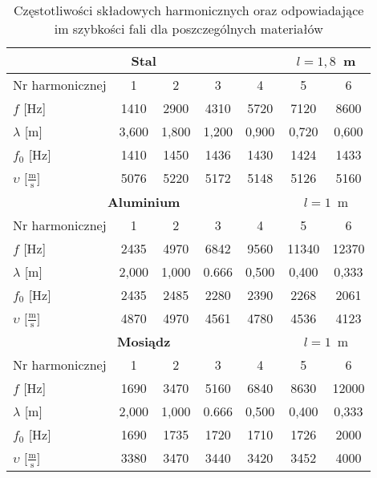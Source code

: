 \documentclass[12pt,a4paper]{article}
\numberwithin{equation}{section}
\begin{document}
\pagebreak
\begin{table}[!ht]
	\caption{Częstotliwości składowych harmonicznych oraz odpowiadające im szybkości fali dla poszczególnych materiałów}
	\centering
	\begin{adjustbox}{height=0.448\textheight}
		\begin{center}
			\begin{tabular}{l||c|c|c|c|c|c}
				\multicolumn{5}{c}{\hspace{3.25cm}\bfseries Stal} & \multicolumn{2}{c}{$l = 1,8$~m} \\ \hline
				Nr harmonicznej & 1 & 2 & 3 & 4 & 5 & 6  \\
				$f$ [Hz] & 1410 & 2900 & 4310 & 5720 & 7120 & 8600  \\
				$\lambda$ [m] & 3,600 & 1,800 & 1,200 & 0,900 & 0,720 & 0,600  \\ 
				$f_0$ [Hz] & 1410 & 1450 & 1436 & 1430 & 1424 & 1433  \\
				$\upsilon$ $\Big[\frac{\textrm{m}}{\textrm{s}}\Big]$ & 5076 & 5220 & 5172 & 5148 & 5126 & 5160  \\[1pt] \hline
				\multicolumn{5}{c}{\hspace{3.25cm}\bfseries Aluminium} & \multicolumn{2}{c}{$l = 1$~m} \\ \hline
				Nr harmonicznej & 1 & 2 & 3 & 4 & 5 & 6  \\
				$f$ [Hz] & 2435 & 4970 & 6842 & 9560 & 11340 & 12370 \\
				$\lambda$ [m] & 2,000 & 1,000 & 0.666 & 0,500 & 0,400 & 0,333  \\ 
				$f_0$ [Hz] & 2435 & 2485& 2280& 2390& 2268& 2061  \\
				$\upsilon$ $\Big[\frac{\textrm{m}}{\textrm{s}}\Big]$ & 4870 & 4970 & 4561 & 4780 & 4536 & 4123 \\[1pt] \hline
				\multicolumn{5}{c}{\hspace{3.25cm}\bfseries Mosiądz} & \multicolumn{2}{c}{$l = 1$~m} \\ \hline
				Nr harmonicznej & 1 & 2 & 3 & 4 & 5 & 6  \\
				$f$ [Hz] & 1690 & 3470 & 5160 & 6840 & 8630 & 12000 \\
				$\lambda$ [m] & 2,000 & 1,000 & 0.666 & 0,500 & 0,400 & 0,333  \\ 
				$f_0$ [Hz] & 1690 & 1735 & 1720 & 1710 & 1726 & 2000  \\
				$\upsilon$ $\Big[\frac{\textrm{m}}{\textrm{s}}\Big]$ & 3380 & 3470 & 3440 & 3420 & 3452 & 4000 \\[1pt] \hline

\end{tabular}
\end{center}
\end{adjustbox}
\end{table}
\end{document}
